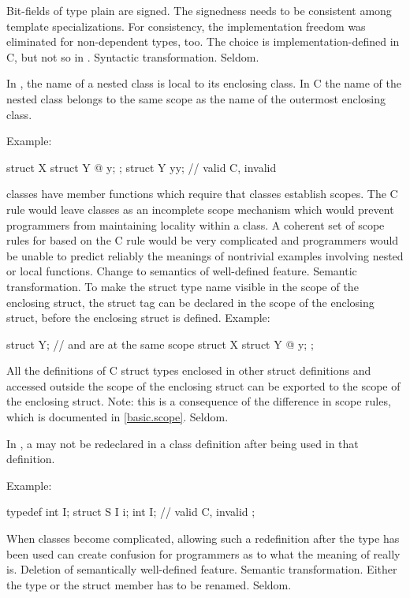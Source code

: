 \change
{}%
Bit-fields of type plain  are signed.
\rationale
The signedness needs to be consistent among template specializations.
For consistency,
the implementation freedom was eliminated for non-dependent types,
too.
\effect
The choice is implementation-defined in C, but not so in \Cpp{}.
\difficulty
Syntactic transformation.
\howwide
Seldom.

\change
In \Cpp{}, the name of a nested class is local to its enclosing class. In C
the name of the nested class belongs to the same scope as the name of the outermost enclosing class.

Example:
\begin{codeblock}
struct X {
  struct Y { @\commentellip@ } y;
};
struct Y yy;                    // valid C, invalid \Cpp{}
\end{codeblock}
\rationale
\Cpp{} classes have member functions which require that classes
establish scopes.
The C rule would leave classes as an incomplete scope mechanism
which would prevent \Cpp{} programmers from maintaining locality
within a class.
A coherent set of scope rules for \Cpp{} based on the C rule would
be very complicated and \Cpp{} programmers would be unable to predict
reliably the meanings of nontrivial examples involving nested or
local functions.
\effect
Change to semantics of well-defined feature.
\difficulty
Semantic transformation.
To make the struct type name visible in the scope of the enclosing
struct, the struct tag can be declared in the scope of the
enclosing struct, before the enclosing struct is defined.
Example:
\begin{codeblock}
struct Y;                       //  and  are at the same scope
struct X {
  struct Y { @\commentellip@ } y;
};
\end{codeblock}

All the definitions of C struct types enclosed in other struct
definitions and accessed outside the scope of the enclosing
struct can be exported to the scope of the enclosing struct.
Note: this is a consequence of the difference in scope rules,
which is documented in \ref{basic.scope}.
\howwide
Seldom.

\change
In \Cpp{}, a  may not be redeclared in a class definition after being used in that definition.

Example:
\begin{codeblock}
typedef int I;
struct S {
  I i;
  int I;            // valid C, invalid \Cpp{}
};
\end{codeblock}
\rationale
When classes become complicated, allowing such a redefinition
after the type has been used can create confusion for \Cpp{}
programmers as to what the meaning of  really is.
\effect
Deletion of semantically well-defined feature.
\difficulty
Semantic transformation.
Either the type or the struct member has to be renamed.
\howwide
Seldom.

